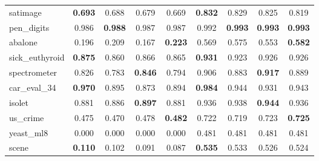 \begin{figure}[ht]
\begin{tabular}{p{22mm}|*4{p{14mm}}|*4{p{14mm}}}
        satimage&\multicolumn{1}{c}{\textbf{0.693}}&\multicolumn{1}{c}{0.688}&\multicolumn{1}{c}{0.679}&\multicolumn{1}{c|}{0.669}&\multicolumn{1}{c}{\textbf{0.832}}&\multicolumn{1}{c}{0.829}&\multicolumn{1}{c}{0.825}&\multicolumn{1}{c}{0.819}\\
        pen\_digits&\multicolumn{1}{c}{0.986}&\multicolumn{1}{c}{\textbf{0.988}}&\multicolumn{1}{c}{0.987}&\multicolumn{1}{c|}{0.987}&\multicolumn{1}{c}{0.992}&\multicolumn{1}{c}{\textbf{0.993}}&\multicolumn{1}{c}{\textbf{0.993}}&\multicolumn{1}{c}{\textbf{0.993}}\\
        abalone&\multicolumn{1}{c}{0.196}&\multicolumn{1}{c}{0.209}&\multicolumn{1}{c}{0.167}&\multicolumn{1}{c|}{\textbf{0.223}}&\multicolumn{1}{c}{0.569}&\multicolumn{1}{c}{0.575}&\multicolumn{1}{c}{0.553}&\multicolumn{1}{c}{\textbf{0.582}}\\
        sick\_euthyroid&\multicolumn{1}{c}{\textbf{0.875}}&\multicolumn{1}{c}{0.860}&\multicolumn{1}{c}{0.866}&\multicolumn{1}{c|}{0.865}&\multicolumn{1}{c}{\textbf{0.931}}&\multicolumn{1}{c}{0.923}&\multicolumn{1}{c}{0.926}&\multicolumn{1}{c}{0.926}\\
        spectrometer&\multicolumn{1}{c}{0.826}&\multicolumn{1}{c}{0.783}&\multicolumn{1}{c}{\textbf{0.846}}&\multicolumn{1}{c|}{0.794}&\multicolumn{1}{c}{0.906}&\multicolumn{1}{c}{0.883}&\multicolumn{1}{c}{\textbf{0.917}}&\multicolumn{1}{c}{0.889}\\
        car\_eval\_34&\multicolumn{1}{c}{\textbf{0.970}}&\multicolumn{1}{c}{0.895}&\multicolumn{1}{c}{0.873}&\multicolumn{1}{c|}{0.894}&\multicolumn{1}{c}{\textbf{0.984}}&\multicolumn{1}{c}{0.944}&\multicolumn{1}{c}{0.931}&\multicolumn{1}{c}{0.943}\\
        isolet&\multicolumn{1}{c}{0.881}&\multicolumn{1}{c}{0.886}&\multicolumn{1}{c}{\textbf{0.897}}&\multicolumn{1}{c|}{0.881}&\multicolumn{1}{c}{0.936}&\multicolumn{1}{c}{0.938}&\multicolumn{1}{c}{\textbf{0.944}}&\multicolumn{1}{c}{0.936}\\
        us\_crime&\multicolumn{1}{c}{0.475}&\multicolumn{1}{c}{0.470}&\multicolumn{1}{c}{0.478}&\multicolumn{1}{c|}{\textbf{0.482}}&\multicolumn{1}{c}{0.722}&\multicolumn{1}{c}{0.719}&\multicolumn{1}{c}{0.723}&\multicolumn{1}{c}{\textbf{0.725}}\\
        yeast\_ml8&\multicolumn{1}{c}{0.000}&\multicolumn{1}{c}{0.000}&\multicolumn{1}{c}{0.000}&\multicolumn{1}{c|}{0.000}&\multicolumn{1}{c}{0.481}&\multicolumn{1}{c}{0.481}&\multicolumn{1}{c}{0.481}&\multicolumn{1}{c}{0.481}\\
        scene&\multicolumn{1}{c}{\textbf{0.110}}&\multicolumn{1}{c}{0.102}&\multicolumn{1}{c}{0.091}&\multicolumn{1}{c|}{0.087}&\multicolumn{1}{c}{\textbf{0.535}}&\multicolumn{1}{c}{0.533}&\multicolumn{1}{c}{0.526}&\multicolumn{1}{c}{0.524}\\

\end{tabular}
\end{figure}
